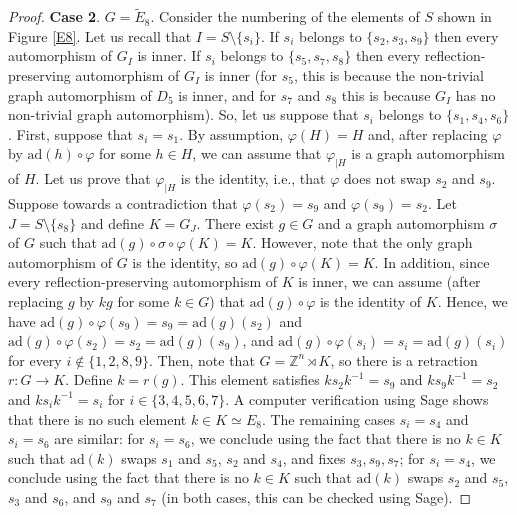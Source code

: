 \documentclass[a4paper, 11pt]{amsart}
\theoremstyle{definition}
\theoremstyle{remark}
\begin{document}
\begin{proof}
\medskip
\noindent \textbf{Case 2}. $G=\tilde{E}_8$. 
\newline Consider the numbering of the elements of $S$ shown in Figure \ref{E8}. Let us recall that $I=S\setminus \lbrace s_i\rbrace$. If $s_i$ belongs to $\lbrace s_2,s_3,s_9\rbrace$ then every automorphism of $G_I$ is inner. If $s_i$ belongs to $\lbrace s_5,s_7,s_8\rbrace$ then every reflection-preserving automorphism of $G_I$ is inner (for $s_5$, this is because the non-trivial graph automorphism of $D_5$ is inner, and for $s_7$ and $s_8$ this is because $G_I$ has no non-trivial graph automorphism). So, let us suppose that $s_i$ belongs to $\lbrace s_1,s_4,s_6\rbrace$. First, suppose that $s_i=s_1$. By assumption, $\varphi(H)=H$ and, after replacing $\varphi$ by $\mathrm{ad}(h)\circ \varphi$ for some $h\in H$, we can assume that $\varphi_{\vert H}$ is a graph automorphism of $H$. Let us prove that $\varphi_{\vert H}$ is the identity, i.e., that $\varphi$ does not swap $s_2$ and $s_9$. Suppose towards a contradiction that $\varphi(s_2)=s_9$ and $\varphi(s_9)=s_2$. Let $J=S\setminus \lbrace s_8\rbrace$ and define $K=G_J$. There exist $g\in G$ and a graph automorphism $\sigma$ of $G$ such that $\mathrm{ad}(g)\circ\sigma\circ \varphi(K)=K$. However, note that the only graph automorphism of $G$ is the identity, so $\mathrm{ad}(g)\circ \varphi(K)=K$. In addition, since every reflection-preserving automorphism of $K$ is inner, we can assume (after replacing $g$ by $kg$ for some $k\in G$) that $\mathrm{ad}(g)\circ \varphi$ is the identity of $K$. Hence, we have $\mathrm{ad}(g)\circ \varphi(s_9)=s_9=\mathrm{ad}(g)(s_2)$ and $\mathrm{ad}(g)\circ \varphi(s_2)=s_2=\mathrm{ad}(g)(s_9)$, and $\mathrm{ad}(g)\circ \varphi(s_i)=s_i=\mathrm{ad}(g)(s_i)$ for every $i\notin \lbrace 1,2,8,9\rbrace$. Then, note that $G=\mathbb{Z}^n\rtimes K$, so there is a retraction $r:G\rightarrow K$. Define $k=r(g)$. This element satisfies $ks_2k^{-1}=s_9$ and $ks_9k^{-1}=s_2$ and $ks_ik^{-1}=s_i$ for $i\in \lbrace 3,4,5,6,7\rbrace$. A computer verification using Sage shows that there is no such element $k\in K\simeq E_8$. The remaining cases $s_i=s_4$ and $s_i=s_6$ are similar: for $s_i=s_6$, we conclude using the fact that there is no $k\in K$ such that $\mathrm{ad}(k)$ swaps $s_1$ and $s_5$, $s_2$ and $s_4$, and fixes $s_3,s_9,s_7$; for $s_i=s_4$, we conclude using the fact that there is no $k\in K$ such that $\mathrm{ad}(k)$ swaps $s_2$ and $s_5$, $s_3$ and $s_6$, and $s_9$ and $s_7$ (in both cases, this can be checked using Sage).


\end{proof}
\end{document}
